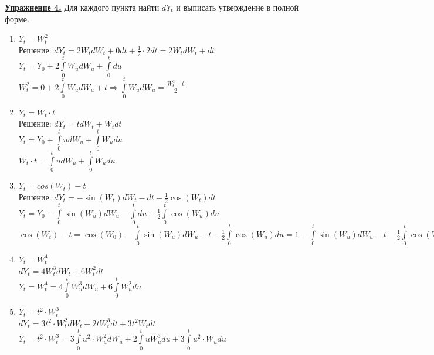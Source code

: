 \documentclass[a4paper]{article}
\begin{document}
 \par {\bf\underline{Упражнение 4.}} Для каждого пункта найти $dY_t$ и выписать утверждение в полной форме.

 \begin{enumerate}[label={\alph*)}]
 \item $Y_t=W^{2}_{t}$\\

 Решение: $dY_t=2W_tdW_t+0dt+\frac{1}{2}\cdot 2dt=2W_tdW_t+dt$\\

 $Y_t=Y_0+2\int\limits_{0}^{t}W_udW_u+\int\limits_{0}^{t}du$\\

 $W^{2}_{t}=0+2\int\limits_{0}^{t}W_udW_u+t \Rightarrow \int\limits_{0}^{t}W_udW_u=\frac{W^{2}_{t}-t}{2}$

 \item $Y_t=W_t\cdot t$\\

 Решение: $dY_t=tdW_t+W_tdt$\\

 $Y_t=Y_0+\int\limits_{0}^{t}udW_u+\int\limits_{0}^{t}W_udu$\\

 $W_t\cdot t=\int\limits_{0}^{t}udW_u+\int\limits_{0}^{t}W_udu$

 \item\label{c} $Y_t=cos(W_t)-t$\\

 Решение: $dY_t=-\sin(W_t)dW_t-dt-\frac{1}{2}\cos(W_t)dt$\\

 $Y_t=Y_0-\int\limits_{0}^{t}\sin(W_u)dW_u-\int\limits_{0}^{t}du-\frac{1}{2}\int\limits_{0}^{t}\cos(W_u)du$\\

 $\cos(W_t)-t=\cos(W_0)-\int\limits_{0}^{t}\sin(W_u)dW_u-t-\frac{1}{2}\int\limits_{0}^{t}\cos(W_u)du=1-\int\limits_{0}^{t}\sin(W_u)dW_u-t-\frac{1}{2}\int\limits_{0}^{t}\cos(W_u)du$\\

 \item\label{d} $Y_t=W^{4}_{t}$\\

 $dY_t=4W^{3}_{t}dW_t+6W^{2}_{t}dt$\\

 $Y_t=W^{4}_{t}=4\int\limits_{0}^{t}W^{3}_{u}dW_u+6\int\limits_{0}^{t}W^{2}_{u}du$\\

 \item\label{e} $Y_t=t^2\cdot W^{3}_{t}$\\

 $dY_t=3t^2\cdot W^{2}_{t}dW_t+2tW^{3}_tdt+3t^2W_tdt$\\

 $Y_t=t^2\cdot W^{3}_{t}=3\int\limits_{0}^{t}u^2\cdot W^{2}_{u}dW_u+2\int\limits_{0}^{t}uW^{3}_{u}du+3\int\limits_{0}^{t}u^2\cdot W_{u}du$
 \end{enumerate}
\end{document}
